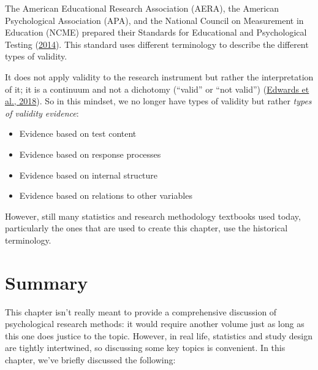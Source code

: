 \documentclass[
  11pt,
]{book}
\providecommand{\tightlist}{%
  \setlength{\itemsep}{0pt}\setlength{\parskip}{0pt}}
\theoremstyle{definition}
\theoremstyle{definition}
\theoremstyle{definition}
\theoremstyle{definition}
\theoremstyle{remark}
\begin{document}
\hypertarget{calloutvalidityterminology}{}
\begin{callout}

The American Educational Research Association (AERA), the American Psychological Association (APA), and the National Council on Measurement in Education (NCME) prepared their Standards for Educational and Psychological Testing (\protect\hyperlink{ref-americaneducationalresearchassociationStandardsEducationalPsychological2014}{2014}). This standard uses different terminology to describe the different types of validity.

It does not apply validity to the research instrument but rather the interpretation of it; it is a continuum and not a dichotomy (``valid'' or ``not valid'') (\protect\hyperlink{ref-edwardsFitPurposeModern2018}{Edwards et al., 2018}). So in this mindset, we no longer have types of validity but rather \emph{types of validity evidence}:

\begin{itemize}
\tightlist
\item
  Evidence based on test content
\item
  Evidence based on response processes
\item
  Evidence based on internal structure
\item
  Evidence based on relations to other variables
\end{itemize}

However, still many statistics and research methodology textbooks used today, particularly the ones that are used to create this chapter, use the historical terminology.

\end{callout}

\hypertarget{summary}{%
\section*{Summary}\label{summary}}

This chapter isn't really meant to provide a comprehensive discussion of psychological research methods: it would require another volume just as long as this one does justice to the topic. However, in real life, statistics and study design are tightly intertwined, so discussing some key topics is convenient. In this chapter, we've briefly discussed the following:
\end{document}
